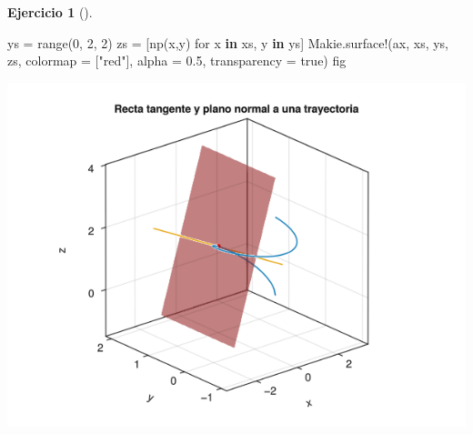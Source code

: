 \documentclass[
  a4paper,
]{scrreport}
\newenvironment{Shaded}{\begin{snugshade}}{\end{snugshade}}
\newcommand{\ConstantTok}[1]{\textcolor[rgb]{0.56,0.35,0.01}{#1}}
\newcommand{\FloatTok}[1]{\textcolor[rgb]{0.68,0.00,0.00}{#1}}
\newcommand{\FunctionTok}[1]{\textcolor[rgb]{0.28,0.35,0.67}{#1}}
\newcommand{\KeywordTok}[1]{\textcolor[rgb]{0.00,0.23,0.31}{\textbf{#1}}}
\newcommand{\NormalTok}[1]{\textcolor[rgb]{0.00,0.23,0.31}{#1}}
\newcommand{\OperatorTok}[1]{\textcolor[rgb]{0.37,0.37,0.37}{#1}}
\newcommand{\StringTok}[1]{\textcolor[rgb]{0.13,0.47,0.30}{#1}}
\theoremstyle{definition}
\newtheorem{exercise}{Ejercicio}[chapter]
\theoremstyle{remark}
\begin{document}
\begin{exercise}[]
\begin{enumerate}
\begin{tcolorbox}
\begin{Shaded}
\begin{Highlighting}[]
\NormalTok{ys }\OperatorTok{=} \FunctionTok{range}\NormalTok{(}\FloatTok{0}\NormalTok{, }\FloatTok{2}\NormalTok{, }\FloatTok{2}\NormalTok{)}
\NormalTok{zs }\OperatorTok{=}\NormalTok{ [}\FunctionTok{np}\NormalTok{(x,y) for x }\KeywordTok{in}\NormalTok{ xs, y }\KeywordTok{in}\NormalTok{ ys]}
\NormalTok{Makie.}\FunctionTok{surface!}\NormalTok{(ax, xs, ys, zs, colormap }\OperatorTok{=}\NormalTok{ [}\StringTok{"red"}\NormalTok{], alpha }\OperatorTok{=} \FloatTok{0.5}\NormalTok{, transparency }\OperatorTok{=} \ConstantTok{true}\NormalTok{)}
\NormalTok{fig}
\end{Highlighting}
\end{Shaded}

  \includegraphics{08-funciones-vectoriales_files/figure-pdf/cell-17-output-1.png}

  \end{tcolorbox}
\end{enumerate}

\end{exercise}
\end{document}

